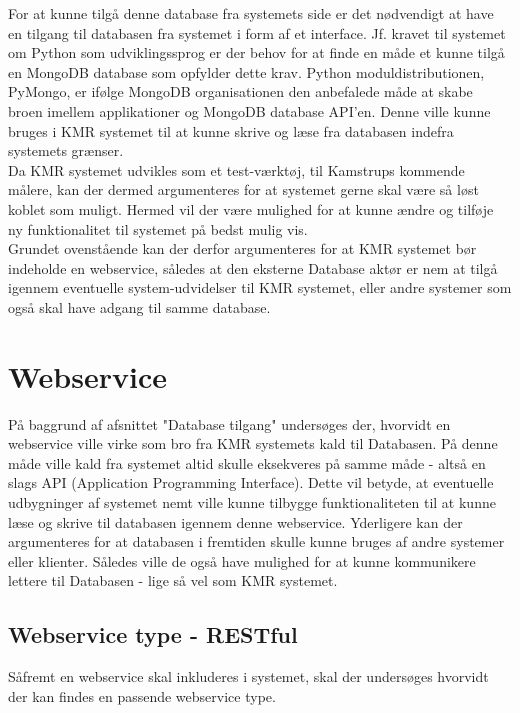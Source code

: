 \begin{appendices}
For at kunne tilgå denne database fra systemets side er det nødvendigt at have en tilgang til databasen fra systemet i form af et interface. Jf. kravet til systemet om Python som udviklingssprog er der behov for at finde en måde et kunne tilgå en MongoDB database som opfylder dette krav.
Python moduldistributionen, PyMongo, er ifølge MongoDB organisationen den anbefalede måde at skabe broen imellem applikationer og MongoDB database API'en. Denne ville kunne bruges i KMR systemet til at kunne skrive og læse fra databasen indefra systemets grænser. \\

Da KMR systemet udvikles som et test-værktøj, til Kamstrups kommende målere, kan der dermed argumenteres for at systemet gerne skal være så løst koblet som muligt. Hermed vil der være mulighed for at kunne ændre og tilføje ny funktionalitet til systemet på bedst mulig vis. \\

Grundet ovenstående kan der derfor argumenteres for at KMR systemet bør indeholde en webservice, således at den eksterne Database aktør er nem at tilgå igennem eventuelle system-udvidelser til KMR systemet, eller andre systemer som også skal have adgang til samme database. \\

\pagebreak
\section{Webservice} \label{appendix::studycase::webservice}
På baggrund af afsnittet "Database tilgang" undersøges der, hvorvidt en webservice ville virke som bro fra KMR systemets kald til Databasen. På denne måde ville kald fra systemet altid skulle eksekveres på samme måde - altså en slags API (Application Programming Interface). Dette vil betyde, at eventuelle udbygninger af systemet nemt ville kunne tilbygge funktionaliteten til at kunne læse og skrive til databasen igennem denne webservice. Yderligere kan der argumenteres for at databasen i fremtiden skulle kunne bruges af andre systemer eller klienter. Således ville de også have mulighed for at kunne kommunikere lettere til Databasen - lige så vel som KMR systemet. \\

\subsection{Webservice type - RESTful}
Såfremt en webservice skal inkluderes i systemet, skal der undersøges hvorvidt der kan findes en passende webservice type.


\end{appendices}
